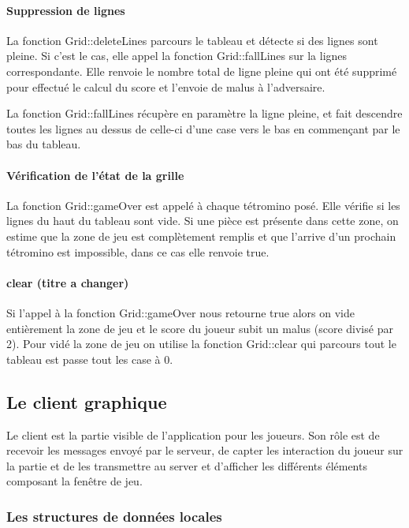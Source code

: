 \documentclass[a4paper, 12pt]{article}
\begin{document}
			\paragraph{Suppression de lignes}
				La fonction Grid::deleteLines parcours le tableau et détecte si des lignes sont pleine.
				Si c’est le cas, elle appel la fonction Grid::fallLines sur la lignes correspondante.
				Elle renvoie le nombre total de ligne pleine qui ont été supprimé pour effectué le calcul du score et l’envoie de malus à l’adversaire.

				La fonction Grid::fallLines récupère en paramètre la ligne pleine, et fait descendre toutes les lignes au dessus de celle-ci d’une case vers le bas en commençant par le bas du tableau.

			\paragraph{Vérification de l’état de la grille}

				La fonction Grid::gameOver est appelé à chaque tétromino posé. Elle vérifie si les lignes du haut du tableau sont vide. Si une pièce est présente dans cette zone, on estime que la zone de jeu est complètement remplis et que l’arrive d’un prochain tétromino est impossible, dans ce cas elle renvoie true.

			\paragraph{clear (titre a changer)}

				Si l’appel à la fonction Grid::gameOver nous retourne true alors on vide entièrement la zone de jeu et le score du joueur subit un malus (score divisé par 2). 
				Pour vidé la zone de jeu on utilise la fonction Grid::clear qui parcours tout le tableau est passe tout les case à 0.



	\subsection{Le client graphique}

		Le client est la partie visible de l’application pour les joueurs. Son rôle est de recevoir les messages envoyé par le serveur, de capter les interaction du joueur sur la partie et de les transmettre au server et d’afficher les différents éléments composant la fenêtre de jeu.

		\subsubsection{Les structures de données locales}
\end{document}
